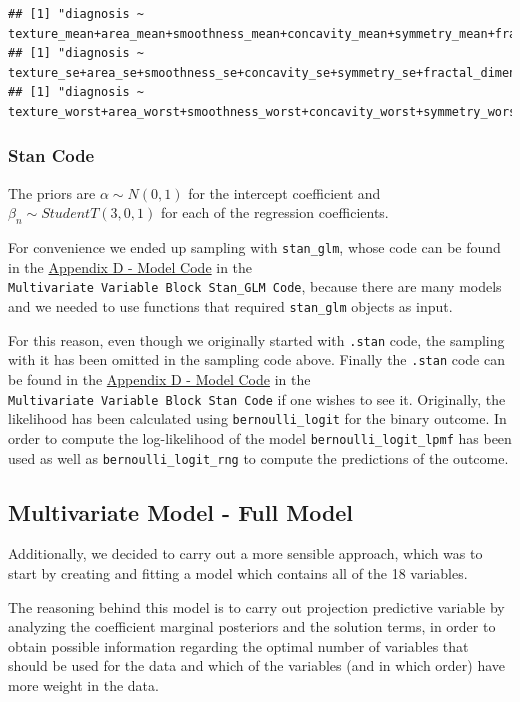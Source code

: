 \documentclass[
]{article}
\begin{document}
\begin{verbatim}
## [1] "diagnosis ~ texture_mean+area_mean+smoothness_mean+concavity_mean+symmetry_mean+fractal_dimension_mean"
## [1] "diagnosis ~ texture_se+area_se+smoothness_se+concavity_se+symmetry_se+fractal_dimension_se"
## [1] "diagnosis ~ texture_worst+area_worst+smoothness_worst+concavity_worst+symmetry_worst+fractal_dimension_worst"
\end{verbatim}

\hypertarget{stan-code-1}{%
\subsubsection{Stan Code}\label{stan-code-1}}

The priors are \(\alpha \sim N(0,1)\) for the intercept coefficient and
\(\beta_n \sim StudentT(3,0,1)\) for each of the regression
coefficients.

For convenience we ended up sampling with \texttt{stan\_glm}, whose code
can be found in the \protect\hyperlink{apb}{Appendix D - Model Code} in
the \texttt{Multivariate\ Variable\ Block\ Stan\_GLM\ Code}, because
there are many models and we needed to use functions that required
\texttt{stan\_glm} objects as input.

For this reason, even though we originally started with \texttt{.stan}
code, the sampling with it has been omitted in the sampling code above.
Finally the \texttt{.stan} code can be found in the
\protect\hyperlink{apb}{Appendix D - Model Code} in the
\texttt{Multivariate\ Variable\ Block\ Stan\ Code} if one wishes to see
it. Originally, the likelihood has been calculated using
\texttt{bernoulli\_logit} for the binary outcome. In order to compute
the log-likelihood of the model \texttt{bernoulli\_logit\_lpmf} has been
used as well as \texttt{bernoulli\_logit\_rng} to compute the
predictions of the outcome.

\hypertarget{multivariate-model---full-model}{%
\subsection{Multivariate Model - Full
Model}\label{multivariate-model---full-model}}

Additionally, we decided to carry out a more sensible approach, which
was to start by creating and fitting a model which contains all of the
18 variables.

The reasoning behind this model is to carry out projection predictive
variable by analyzing the coefficient marginal posteriors and the
solution terms, in order to obtain possible information regarding the
optimal number of variables that should be used for the data and which
of the variables (and in which order) have more weight in the data.
\end{document}
